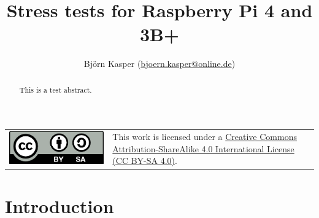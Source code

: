 \documentclass [oneside,10pt,a4paper,ngerman,BCOR10mm,headsepline,parindent,final]{scrartcl}
\title{\textbf{\textsf{Stress tests for Raspberry Pi 4 and 3B+}}}
\author{Björn Kasper (\href{mailto:bjoern.kasper@online.de}{bjoern.kasper@online.de})}
\begin{document}
    \pagestyle{empty}%
    
    \maketitle\thispagestyle{empty}
    
    \vfill

     \noindent
     \begin{tabular}{l l}
        \begin{minipage}{0.24\textwidth}
            \includegraphics{images/CC_BY-SA_40.png}
        \end{minipage}
        &
        \begin{minipage}{0.68\textwidth}
            This work is licensed under a \href{https://creativecommons.org/licenses/by-sa/4.0/}{Creative Commons Attribution-ShareAlike 4.0 International License (CC BY-SA 4.0)}.
        \end{minipage}
     \end{tabular}

     \newpage
    
    \begin{abstract}
This is a test abstract.
\end{abstract}

    \pagestyle{fancy}                   %
    \fancyhf{}                          %
    \fancyhead[ER,OR]{\leftmark}        %

    \renewcommand{\sectionmark}[1]{
        \markboth{\thesection{} #1}{}
    }
    
    \tableofcontents


    
    \hypertarget{introduction}{%
\section{Introduction}\label{introduction}}
\end{document}
